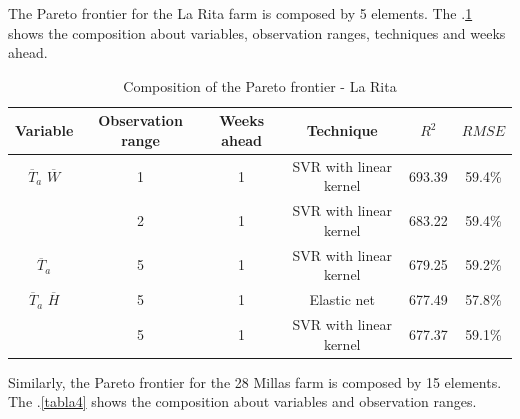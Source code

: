 The Pareto frontier for the La Rita farm is composed by 5 elements. The \tablename $.$\ref{tabla3} shows the composition about variables, observation ranges, techniques and weeks ahead.

\begin{table}[h] 
\caption{Composition of the Pareto frontier - La Rita} 
\label{tabla3} 
\centering
\begin{tabular}{c|c|c|c|c|c} 
\hline
\bfseries Variable & \bfseries Observation range & \bfseries Weeks ahead & \bfseries Technique &\bfseries $R^2$ & \bfseries $RMSE$\\ 
\hline\hline 
$\overline{T}_{a}$ $\overline{W}$ &	1  & 1 & SVR with linear kernel & 693.39 & 59.4\% \\
										&	2  & 1 & SVR with linear kernel & 683.22 & 59.4\% \\
\hline 
$\overline{T}_{a}$  &  5 & 1 &  SVR with linear kernel & 679.25 & 59.2\% \\
\hline 
$\overline{T}_{a}$ $\overline{H}$ &	5  & 1 & Elastic net & 677.49 & 57.8\% \\
										&	5  & 1 & SVR with linear kernel & 677.37 & 59.1\% \\
\hline										
\end{tabular} 
\end{table}
%
Similarly, the Pareto frontier for the 28 Millas farm is composed by 15 elements. The \tablename $.$\ref{tabla4} shows the composition about variables and observation ranges.

